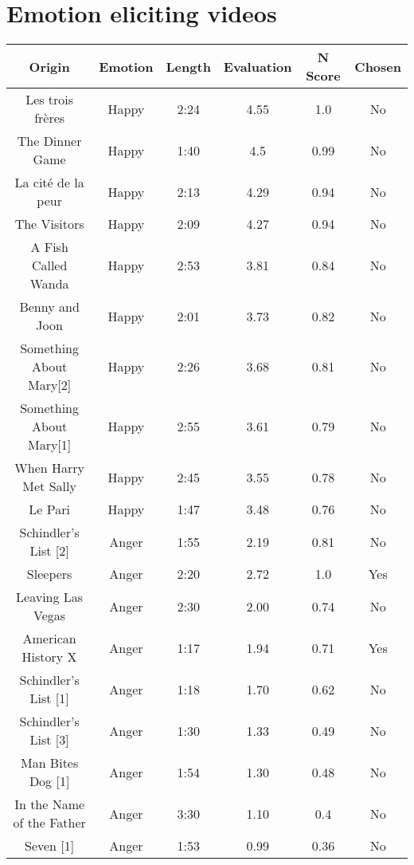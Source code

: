 \chapter{Emotion eliciting videos}
\begin{table}[]
    \centering
    \begin{tabular}{|c|c|c|c|c|c|}
        \hline
         Origin & Emotion & Length & Evaluation & N Score & Chosen  \\ \hline
         Les trois frères & Happy & 2:24 & 4.55 & 1.0  & No \\ \hline
         The Dinner Game & Happy & 1:40 & 4.5 & 0.99   & No \\ \hline
         La cité de la peur & Happy & 2:13 & 4.29 & 0.94  & No \\ \hline
         The Visitors & Happy & 2:09 & 4.27 & 0.94  & No \\ \hline
         A Fish Called Wanda & Happy & 2:53 & 3.81 & 0.84   & No \\ \hline
         Benny and Joon & Happy & 2:01 & 3.73 & 0.82  & No \\ \hline
         Something About Mary[2] & Happy & 2:26 & 3.68 & 0.81  & No \\ \hline
         Something About Mary[1] & Happy & 2:55 & 3.61 & 0.79  & No \\ \hline
         When Harry Met Sally & Happy & 2:45 & 3.55 & 0.78  & No \\ \hline
         Le Pari & Happy & 1:47 & 3.48 & 0.76 & No \\ \hline
         Schindler’s List [2] & Anger & 1:55 & 2.19 & 0.81   & No \\ \hline
         Sleepers & Anger & 2:20 & 2.72 & 1.0   & Yes \\ \hline
         Leaving Las Vegas & Anger & 2:30 & 2.00 & 0.74  & No \\ \hline
         American History X & Anger & 1:17 & 1.94  & 0.71   & Yes \\ \hline
         Schindler’s List [1] & Anger & 1:18 & 1.70 & 0.62  & No \\ \hline
        Schindler’s List [3] & Anger & 1:30 & 1.33  & 0.49   & No \\ \hline
         Man Bites Dog [1] & Anger & 1:54 & 1.30  & 0.48 & No \\ \hline
         In the Name of the Father & Anger & 3:30 & 1.10 & 0.4   & No \\ \hline
         Seven [1] & Anger & 1:53 & 0.99  & 0.36  & No \\ \hline

\end{tabular}
\end{table}

